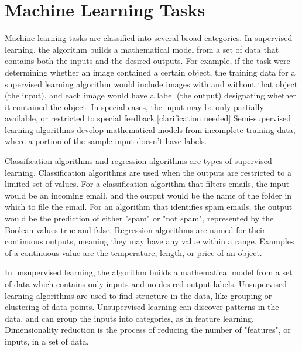 \documentclass[utf8,bachelor,english]{gradu3}
\begin{document}
\chapter{Machine Learning Tasks}

Machine learning tasks are classified into several broad categories. In supervised learning, the algorithm builds a mathematical model from a set of data that contains both the inputs and the desired outputs. For example, if the task were determining whether an image contained a certain object, the training data for a supervised learning algorithm would include images with and without that object (the input), and each image would have a label (the output) designating whether it contained the object. In special cases, the input may be only partially available, or restricted to special feedback.[clarification needed] Semi-supervised learning algorithms develop mathematical models from incomplete training data, where a portion of the sample input doesn't have labels.

Classification algorithms and regression algorithms are types of supervised learning. Classification algorithms are used when the outputs are restricted to a limited set of values. For a classification algorithm that filters emails, the input would be an incoming email, and the output would be the name of the folder in which to file the email. For an algorithm that identifies spam emails, the output would be the prediction of either "spam" or "not spam", represented by the Boolean values true and false. Regression algorithms are named for their continuous outputs, meaning they may have any value within a range. Examples of a continuous value are the temperature, length, or price of an object.

In unsupervised learning, the algorithm builds a mathematical model from a set of data which contains only inputs and no desired output labels. Unsupervised learning algorithms are used to find structure in the data, like grouping or clustering of data points. Unsupervised learning can discover patterns in the data, and can group the inputs into categories, as in feature learning. Dimensionality reduction is the process of reducing the number of "features", or inputs, in a set of data.
\end{document}
